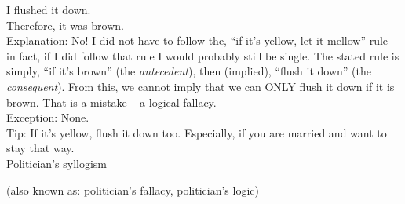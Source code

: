 \documentclass[a4paper,12pt,single,pdftex]{scrartcl}
\begin{document}
    
      I flushed it down.
    \\

    
      Therefore, it was brown.
    \\

    
      Explanation: No!  I did not have to follow the, “if it’s yellow, let it mellow” rule -- in fact, if I did follow that rule I would probably still be single.  The stated rule is simply, “if it’s brown” (the {\it antecedent}), then (implied), “flush it down” (the {\it consequent}).  From this, we cannot imply that we can ONLY flush it down if it is brown.  That is a mistake -- a logical fallacy.
    \\

    
      Exception: None.
    \\

    
      Tip: If it’s yellow, flush it down too. Especially, if you are married and want to stay that way.
    \\

  

Politician's syllogism
    
      (also known as: politician's fallacy, politician's logic)
    \\
\end{document}
